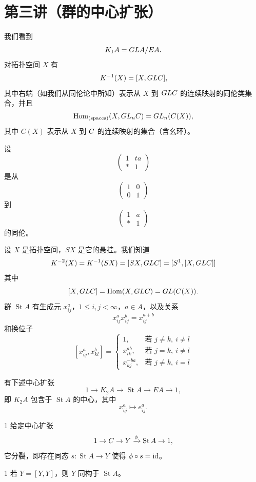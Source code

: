 \section{第三讲（群的中心扩张）}

我们看到
\[
  K_1A = GL A/EA.
\]
对拓扑空间 $X$ 有
\[
  K^{-1}(X) = [X,GLC],
\]
其中右端（如我们从同伦论中所知）表示从 $X$ 到 $GLC$ 的连续映射的同伦类集合，并且
\[
  \operatorname{Hom}_{(\text{spaces})}(X,GL_nC) = GL_n(C(X)),
\]
其中 $C(X)$ 表示从 $X$ 到 $C$ 的连续映射的集合（含幺环）。

设
\[
  \begin{pmatrix} 1 & ta \\ * & 1 \end{pmatrix}
\]
是从
\[
  \begin{pmatrix} 1 & 0 \\ 0 & 1 \end{pmatrix}
\]
到
\[
  \begin{pmatrix} 1 & a \\ * & 1 \end{pmatrix}
\]
的同伦。

设 $X$ 是拓扑空间，$SX$ 是它的悬挂。我们知道
\[
  K^{-2}(X) = K^{-1}(SX) = [SX,GLC] = [S^1,[X,GLC]]
\]
其中
\[
  [X,GLC] = \operatorname{Hom}(X,GLC) = GL(C(X)).
\]
群 $\operatorname{St}A$ 有生成元 $x_{ij}^a$，$1\le i,j<\infty$，$a\in A$，以及关系
\[
  x_{ij}^a x_{ij}^b = x_{ij}^{a+b}
\]
和换位子
\[
  [x_{ij}^a, x_{kl}^b] =
  \begin{cases}
    1, & \text{若 } j\ne k,\ i\ne l \\
    x_{ik}^{ab}, & \text{若 } j=k,\ i\ne l \\
    x_{kj}^{-ba}, & \text{若 } j\ne k,\ i=l
  \end{cases}
\]

有下述中心扩张
\[
  1 \to K_2A \to \operatorname{St}A \to EA \to 1,
\]
即 $K_2A$ 包含于 $\operatorname{St}A$ 的中心，其中
\[
  x_{ij}^a \mapsto e_{ij}^a.
\]

\begin{thm}{1}
给定中心扩张
\[
  1 \to C \to Y \xrightarrow{\phi} \operatorname{St}A \to 1,
\]
它分裂，即存在同态 $s : \operatorname{St}A \to Y$ 使得 $\phi\circ s = \mathrm{id}$。
\end{thm}

\begin{cor}{1}
若 $Y=[Y,Y]$，则 $Y$ 同构于 $\operatorname{St}A$。
\end{cor}

